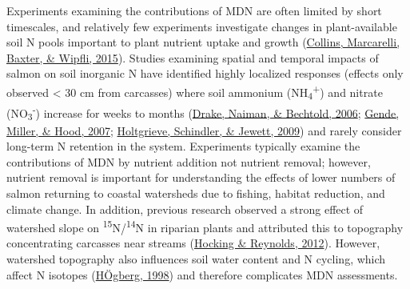\documentclass [11pt, proquest] {uwthesis}[2015/03/03]
\begin{document}
Experiments examining the contributions of MDN are often limited by short timescales, and relatively few experiments investigate changes in plant-available soil N pools important to plant nutrient uptake and growth (\protect\hyperlink{ref-Collins2015}{Collins, Marcarelli, Baxter, \& Wipfli, 2015}). Studies examining spatial and temporal impacts of salmon on soil inorganic N have identified highly localized responses (effects only observed \textless{} 30 cm from carcasses) where soil ammonium (NH\textsubscript{4}\textsuperscript{+}) and nitrate (NO\textsubscript{3}\textsuperscript{-}) increase for weeks to months (\protect\hyperlink{ref-Drake2006}{Drake, Naiman, \& Bechtold, 2006}; \protect\hyperlink{ref-Gende2007}{Gende, Miller, \& Hood, 2007}; \protect\hyperlink{ref-Holtgrieve2009}{Holtgrieve, Schindler, \& Jewett, 2009}) and rarely consider long-term N retention in the system. Experiments typically examine the contributions of MDN by nutrient addition not nutrient removal; however, nutrient removal is important for understanding the effects of lower numbers of salmon returning to coastal watersheds due to fishing, habitat reduction, and climate change. In addition, previous research observed a strong effect of watershed slope on \textsuperscript{15}N/\textsuperscript{14}N in riparian plants and attributed this to topography concentrating carcasses near streams (\protect\hyperlink{ref-Hocking2012}{Hocking \& Reynolds, 2012}). However, watershed topography also influences soil water content and N cycling, which affect N isotopes (\protect\hyperlink{ref-Hogberg1998}{HÖgberg, 1998}) and therefore complicates MDN assessments.
\end{document}
